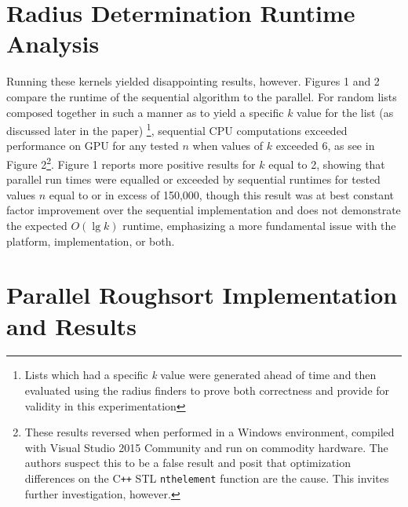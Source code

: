 \documentclass[letterpaper, 12pt]{article}
\begin{document}
\section{Radius Determination Runtime Analysis}

  Running these kernels yielded disappointing results, however.  Figures 1 and 2 compare the runtime of the sequential algorithm to the parallel.
  For random lists composed together in such a manner as to yield a specific $k$ value for the list (as discussed later in the paper)
  \footnote{Lists which had a specific \textit{k} value were generated ahead of time and then evaluated using the radius finders to prove both
  correctness and provide for validity in this experimentation}, sequential CPU computations exceeded performance on GPU for any tested $n$ when
  values of $k$ exceeded 6, as see in Figure 2\footnote{These results reversed when performed in a Windows environment, compiled with Visual 
  Studio 2015 Community and run on commodity hardware.  The authors suspect this to be a false result and posit that optimization differences on
  the C\texttt{++} STL \texttt{nth\textunderscore element} function are the cause.  This invites further investigation, however.}.  Figure 1 
  reports more positive results for $k$ equal to 2, showing that parallel run times were equalled or exceeded by sequential runtimes for tested 
  values $n$ equal to or in excess of 150,000, though this result was at best constant factor improvement over the sequential implementation and
  does not demonstrate the expected $O(\lg k)$ runtime, emphasizing a more fundamental issue with the platform, implementation, or both.

\begin{sidewaysfigure}

\vspace{-4ex}
\caption{\label{fig:seqpar2}{\em
  Radius Determination Runtimes over Arrays of Length $n\cdot 10^6$, $k = 2$
}}
\end{sidewaysfigure}

\begin{sidewaysfigure}

\vspace{-4ex}
\caption{\label{fig:seqpar100}{\em
  Radius Determination Runtimes over Arrays of Length $n\cdot 10^6$, $k = 100$
}}
\end{sidewaysfigure}

\clearpage
\section{Parallel Roughsort Implementation and Results}
\end{document}
